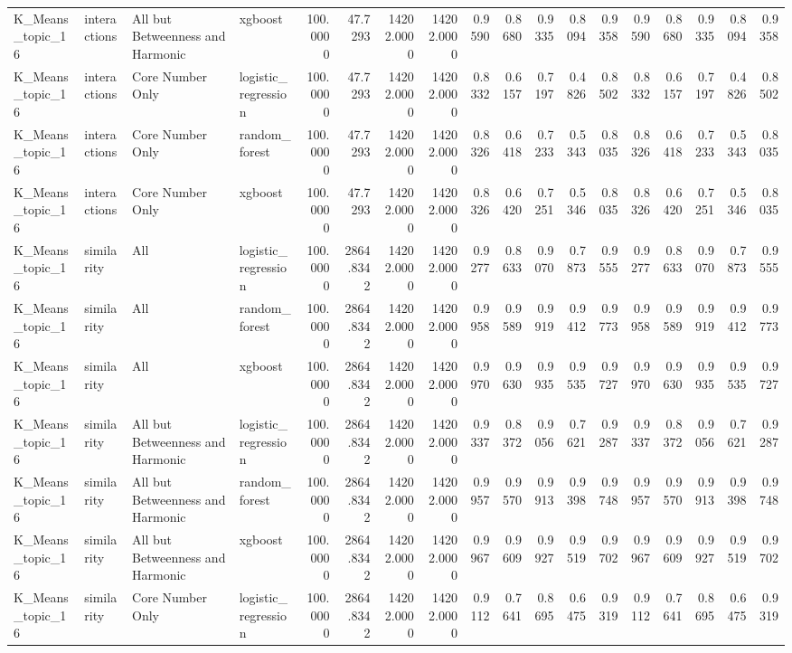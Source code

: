 \begin{tabular}{llllrrrrrrrrrrrrrr}
K_Means_topic_16 & interactions & All but Betweenness and Harmonic & xgboost & 100.0000 & 47.7293 & 14202.0000 & 14202.0000 & 0.9590 & 0.8680 & 0.9335 & 0.8094 & 0.9358 & 0.9590 & 0.8680 & 0.9335 & 0.8094 & 0.9358 \\
K_Means_topic_16 & interactions & Core Number Only & logistic_regression & 100.0000 & 47.7293 & 14202.0000 & 14202.0000 & 0.8332 & 0.6157 & 0.7197 & 0.4826 & 0.8502 & 0.8332 & 0.6157 & 0.7197 & 0.4826 & 0.8502 \\
K_Means_topic_16 & interactions & Core Number Only & random_forest & 100.0000 & 47.7293 & 14202.0000 & 14202.0000 & 0.8326 & 0.6418 & 0.7233 & 0.5343 & 0.8035 & 0.8326 & 0.6418 & 0.7233 & 0.5343 & 0.8035 \\
K_Means_topic_16 & interactions & Core Number Only & xgboost & 100.0000 & 47.7293 & 14202.0000 & 14202.0000 & 0.8326 & 0.6420 & 0.7251 & 0.5346 & 0.8035 & 0.8326 & 0.6420 & 0.7251 & 0.5346 & 0.8035 \\
K_Means_topic_16 & similarity & All & logistic_regression & 100.0000 & 2864.8342 & 14202.0000 & 14202.0000 & 0.9277 & 0.8633 & 0.9070 & 0.7873 & 0.9555 & 0.9277 & 0.8633 & 0.9070 & 0.7873 & 0.9555 \\
K_Means_topic_16 & similarity & All & random_forest & 100.0000 & 2864.8342 & 14202.0000 & 14202.0000 & 0.9958 & 0.9589 & 0.9919 & 0.9412 & 0.9773 & 0.9958 & 0.9589 & 0.9919 & 0.9412 & 0.9773 \\
K_Means_topic_16 & similarity & All & xgboost & 100.0000 & 2864.8342 & 14202.0000 & 14202.0000 & 0.9970 & 0.9630 & 0.9935 & 0.9535 & 0.9727 & 0.9970 & 0.9630 & 0.9935 & 0.9535 & 0.9727 \\
K_Means_topic_16 & similarity & All but Betweenness and Harmonic & logistic_regression & 100.0000 & 2864.8342 & 14202.0000 & 14202.0000 & 0.9337 & 0.8372 & 0.9056 & 0.7621 & 0.9287 & 0.9337 & 0.8372 & 0.9056 & 0.7621 & 0.9287 \\
K_Means_topic_16 & similarity & All but Betweenness and Harmonic & random_forest & 100.0000 & 2864.8342 & 14202.0000 & 14202.0000 & 0.9957 & 0.9570 & 0.9913 & 0.9398 & 0.9748 & 0.9957 & 0.9570 & 0.9913 & 0.9398 & 0.9748 \\
K_Means_topic_16 & similarity & All but Betweenness and Harmonic & xgboost & 100.0000 & 2864.8342 & 14202.0000 & 14202.0000 & 0.9967 & 0.9609 & 0.9927 & 0.9519 & 0.9702 & 0.9967 & 0.9609 & 0.9927 & 0.9519 & 0.9702 \\
K_Means_topic_16 & similarity & Core Number Only & logistic_regression & 100.0000 & 2864.8342 & 14202.0000 & 14202.0000 & 0.9112 & 0.7641 & 0.8695 & 0.6475 & 0.9319 & 0.9112 & 0.7641 & 0.8695 & 0.6475 & 0.9319 \\

\end{tabular}
